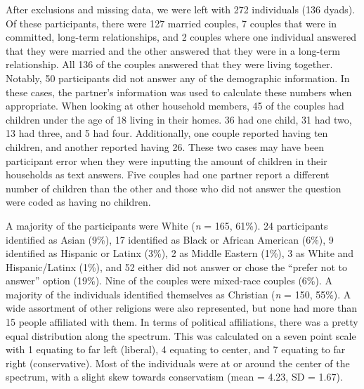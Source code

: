 \documentclass[
  man]{apa6}
\begin{document}
After exclusions and missing data, we were left with 272 individuals (136 dyads). Of these participants, there were 127 married couples, 7 couples that were in committed, long-term relationships, and 2 couples where one individual answered that they were married and the other answered that they were in a long-term relationship. All 136 of the couples answered that they were living together. Notably, 50 participants did not answer any of the demographic information. In these cases, the partner's information was used to calculate these numbers when appropriate. When looking at other household members, 45 of the couples had children under the age of 18 living in their homes. 36 had one child, 31 had two, 13 had three, and 5 had four. Additionally, one couple reported having ten children, and another reported having 26. These two cases may have been participant error when they were inputting the amount of children in their households as text answers. Five couples had one partner report a different number of children than the other and those who did not answer the question were coded as having no children.

A majority of the participants were White (\emph{n} = 165, 61\%). 24 participants identified as Asian (9\%), 17 identified as Black or African American (6\%), 9 identified as Hispanic or Latinx (3\%), 2 as Middle Eastern (1\%), 3 as White and Hispanic/Latinx (1\%), and 52 either did not answer or chose the ``prefer not to answer'' option (19\%). Nine of the couples were mixed-race couples (6\%). A majority of the individuals identified themselves as Christian (\emph{n} = 150, 55\%). A wide assortment of other religions were also represented, but none had more than 15 people affiliated with them. In terms of political affiliations, there was a pretty equal distribution along the spectrum. This was calculated on a seven point scale with 1 equating to far left (liberal), 4 equating to center, and 7 equating to far right (conservative). Most of the individuals were at or around the center of the spectrum, with a slight skew towards conservatism (mean = 4.23, SD = 1.67).
\end{document}
